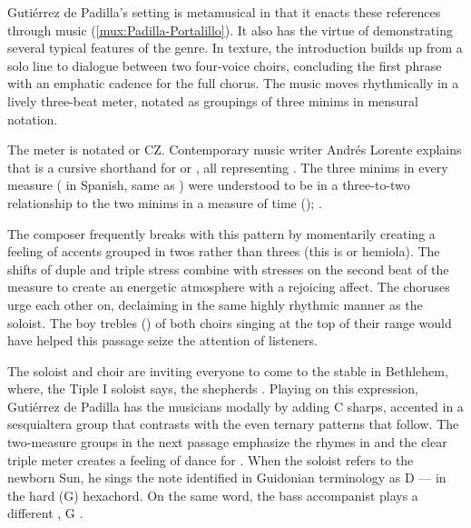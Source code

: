 Gutiérrez de Padilla's setting is metamusical in that it enacts these
references through music (\cref{mux:Padilla-Portalillo}).
It also has the virtue of demonstrating several typical features of the genre.
In texture, the introduction builds up from a solo line to dialogue between two
four-voice choirs, concluding the first phrase with an emphatic cadence for the
full chorus.
The music moves rhythmically in a lively three-beat meter, notated as groupings
of three minims in mensural notation.%
\begin{Footnote}
    The meter is notated \meterCZ{} or CZ.
    Contemporary music writer Andrés Lorente explains that \meterCZ{} is a
    cursive shorthand for \meterCThreeTwo or \meterCThree, all representing
    .
    The three minims in every measure ( in Spanish, same as
    ) were understood to be in a three-to-two relationship to the
    two minims in a measure of  time ();
    \autocites
    [156, 165, 210]{Lorente:Porque}
    [537]{Cerone:Melopeo}.
\end{Footnote}
The composer frequently breaks with this pattern by momentarily creating a
feeling of accents grouped in twos rather than threes (this is
 or hemiola).
The shifts of duple and triple stress combine with stresses on the second beat
of the measure to create an energetic atmosphere with a rejoicing affect.  
The choruses urge each other on, declaiming in the same highly rhythmic manner
as the soloist.
The boy trebles () of both choirs singing at the top of their
range would have helped this passage seize the attention of listeners.

The soloist and choir are inviting everyone to come to the stable in Bethlehem,
where, the Tiple I soloist says, the shepherds .
Playing on this expression, Gutiérrez de Padilla has the musicians
 modally by adding C sharps, accented in a sesquialtera group that
contrasts with the even ternary patterns that follow.
The two-measure groups in the next passage emphasize the rhymes in
 and the clear triple meter creates a
feeling of dance for .
When the soloist refers to the newborn Sun, he sings the note identified in
Guidonian terminology as D --- in the hard (G)
hexachord.  
On the same word, the bass accompanist plays a different , G
.

